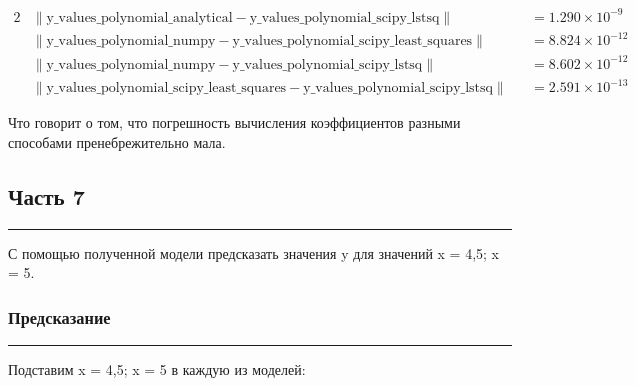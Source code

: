 \documentclass[a4paper, 14pt]{extarticle}
\begin{document}
\begin{alignat*}{2}
    &\| \text{y\_values\_polynomial\_analytical} - \text{y\_values\_polynomial\_scipy\_lstsq} \| &&= 1.290 \times 10^{-9} \\
    &\| \text{y\_values\_polynomial\_numpy} - \text{y\_values\_polynomial\_scipy\_least\_squares} \| &&= 8.824 \times 10^{-12} \\
    &\| \text{y\_values\_polynomial\_numpy} - \text{y\_values\_polynomial\_scipy\_lstsq} \| &&= 8.602 \times 10^{-12} \\
    &\| \text{y\_values\_polynomial\_scipy\_least\_squares} - \text{y\_values\_polynomial\_scipy\_lstsq} \| &&= 2.591 \times 10^{-13}
\end{alignat*}

Что говорит о том, что погрешность вычисления коэффициентов разными способами пренебрежительно мала.

\newpage

\subsection*{{Часть 7}}\vspace{-20pt}\rule{\linewidth}{0.1mm}

С помощью полученной модели предсказать значения y для значений x = 4,5; x = 5.

\subsubsection*{{Предсказание}}\vspace{-20pt}\rule{\linewidth}{0.1mm}

Подставим x = 4,5; x = 5 в каждую из моделей:
\end{document}
